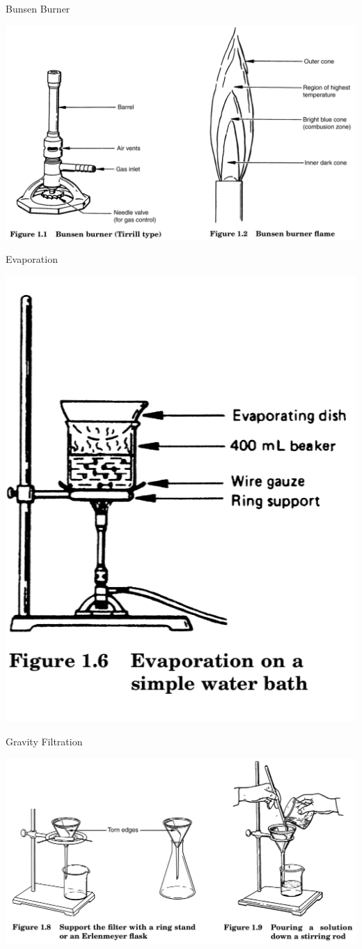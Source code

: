 \documentclass[11pt]{beamer}
\begin{document}
\begin{frame}{Bunsen Burner}
  \begin{center}
    \includegraphics[width=\linewidth]{bunsen_burn}
  \end{center}
\end{frame}

\begin{frame}{Evaporation}
  \begin{center}
    \includegraphics[width=0.5\linewidth]{evap_tech}
  \end{center}
\end{frame}

\begin{frame}{Gravity Filtration}
  \begin{center}
    \includegraphics[width=\linewidth]{grav_filt}
  \end{center}
\end{frame}
\end{document}
